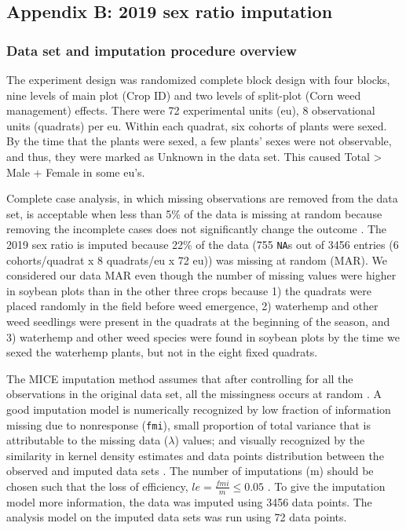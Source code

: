 \documentclass[
]{article}
\begin{document}
\hypertarget{appendix-b-2019-sex-ratio-imputation}{%
\subsection*{Appendix B: 2019 sex ratio imputation}\label{appendix-b-2019-sex-ratio-imputation}}

\hypertarget{data-set-and-imputation-procedure-overview}{%
\subsubsection*{Data set and imputation procedure overview}\label{data-set-and-imputation-procedure-overview}}

The experiment design was randomized complete block design with four blocks, nine levels of main plot (Crop ID) and two levels of split-plot (Corn weed management) effects. There were 72 experimental units (eu), 8 observational units (quadrats) per eu. Within each quadrat, six cohorts of plants were sexed. By the time that the plants were sexed, a few plants' sexes were not observable, and thus, they were marked as Unknown in the data set. This caused Total \textgreater{} Male + Female in some eu's.

Complete case analysis, in which missing observations are removed from the data set, is acceptable when less than 5\% of the data is missing at random because removing the incomplete cases does not significantly change the outcome \citep{azurMultipleImputationChained2011}. The 2019 sex ratio is imputed because 22\% of the data (755 \texttt{NA}s out of 3456 entries (6 cohorts/quadrat x 8 quadrats/eu x 72 eu)) was missing at random (MAR). We considered our data MAR even though the number of missing values were higher in soybean plots than in the other three crops because 1) the quadrats were placed randomly in the field before weed emergence, 2) waterhemp and other weed seedlings were present in the quadrats at the beginning of the season, and 3) waterhemp and other weed species were found in soybean plots by the time we sexed the waterhemp plants, but not in the eight fixed quadrats.

The MICE imputation method assumes that after controlling for all the observations in the original data set, all the missingness occurs at random \citep{vanbuurenMiceMultivariateImputation2011}. A good imputation model is numerically recognized by low fraction of information missing due to nonresponse (\texttt{fmi}), small proportion of total variance that is attributable to the missing data (\(\lambda\)) values; and visually recognized by the similarity in kernel density estimates and data points distribution between the observed and imputed data sets \citep{vanbuurenMiceMultivariateImputation2011}. The number of imputations (m) should be chosen such that the loss of efficiency, \(le = \frac{fmi}{m} \leq 0.05\) \citep{whiteMultipleImputationUsing2011}. To give the imputation model more information, the data was imputed using 3456 data points. The analysis model on the imputed data sets was run using 72 data points.
\end{document}
